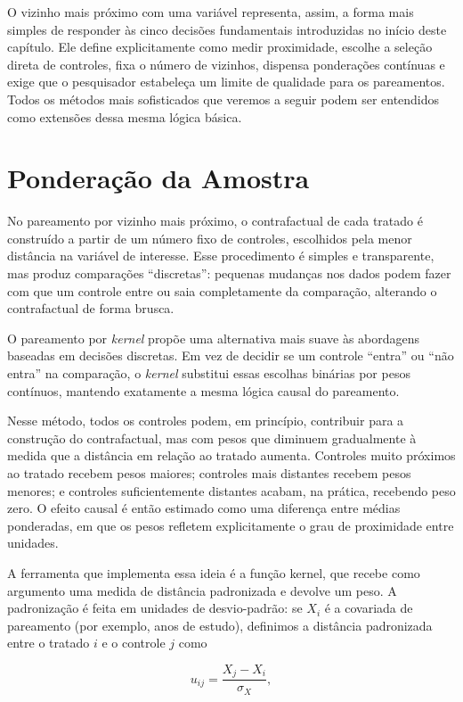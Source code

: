 O vizinho mais próximo com uma variável representa, assim, a forma mais simples de responder às cinco decisões fundamentais introduzidas no início deste capítulo. Ele define explicitamente como medir proximidade, escolhe a seleção direta de controles, fixa o número de vizinhos, dispensa ponderações contínuas e exige que o pesquisador estabeleça um limite de qualidade para os pareamentos. Todos os métodos mais sofisticados que veremos a seguir podem ser entendidos como extensões dessa mesma lógica básica.

\section{Ponderação da Amostra}

No pareamento por vizinho mais próximo, o contrafactual de cada tratado é construído a partir de um número fixo de controles, escolhidos pela menor distância na variável de interesse. Esse procedimento é simples e transparente, mas produz comparações “discretas”: pequenas mudanças nos dados podem fazer com que um controle entre ou saia completamente da comparação, alterando o contrafactual de forma brusca.

O pareamento por \textit{kernel} propõe uma alternativa mais suave às abordagens baseadas em decisões discretas. Em vez de decidir se um controle ``entra'' ou ``não entra'' na comparação, o \textit{kernel} substitui essas escolhas binárias por pesos contínuos, mantendo exatamente a mesma lógica causal do pareamento.

Nesse método, todos os controles podem, em princípio, contribuir para a construção do contrafactual, mas com pesos que diminuem gradualmente à medida que a distância em relação ao tratado aumenta. Controles muito próximos ao tratado recebem pesos maiores; controles mais distantes recebem pesos menores; e controles suficientemente distantes acabam, na prática, recebendo peso zero. O efeito causal é então estimado como uma diferença entre médias ponderadas, em que os pesos refletem explicitamente o grau de proximidade entre unidades.


A ferramenta que implementa essa ideia é a função kernel, que recebe como argumento uma medida de distância padronizada e devolve um peso. A padronização é feita em unidades de desvio-padrão: se $X_i$ é a covariada de pareamento (por exemplo, anos de estudo), definimos a distância padronizada entre o tratado $i$ e o controle $j$ como

$$
u_{ij} = \frac{X_j - X_i}{\sigma_X},
$$


